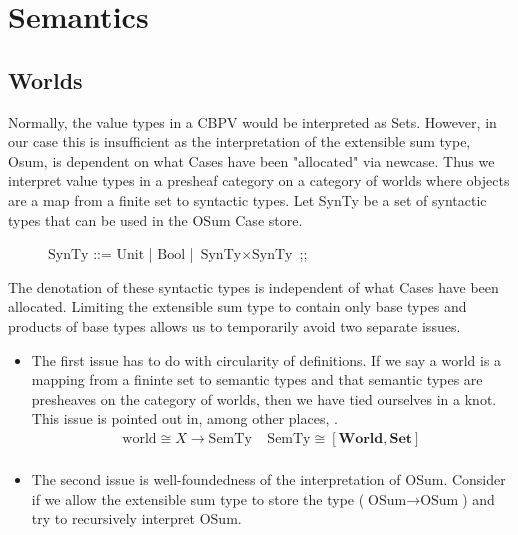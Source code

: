 \documentclass{article}
\newcommand{\world}{{\mathbf{World}}}
\begin{document}
\section{Semantics}
\subsection{Worlds}
Normally, the value types in a CBPV would be interpreted as Sets. However, in our case this is insufficient as 
the interpretation of the extensible sum type, Osum, is dependent on what Cases have been "allocated" via 
newcase. Thus we interpret value types in a presheaf category on a category of worlds where objects are a map 
from a finite set to syntactic types. Let SynTy be a set of syntactic types that can be used in the OSum Case store.

\begin{figure}[!ht]
\centering    
\begin{bnf}
$\textrm{SynTy}$ ::= $\textrm{Unit}$
| $\textrm{Bool}$
| $\textrm{SynTy} \times \textrm{SynTy}$
;;
\end{bnf}
\end{figure}

The denotation of these syntactic types is independent of what Cases have been allocated.
Limiting the extensible sum type to contain only base types and products of base types allows 
us to temporarily avoid two separate issues. 
\begin{itemize}
    \item The first issue has to do with circularity of definitions. If we say a world is a 
    mapping from a fininte set to semantic types and that semantic types are presheaves on 
    the category of worlds, then we have tied ourselves in a knot. This issue is pointed 
    out in, among other places, \cite{sterling_denotational_2023}.
    \begin{align*}
        \textrm{world} \cong X \rightarrow \textrm{SemTy} \;\;\;\; \textrm{SemTy} \cong [\world , \mathbf{Set}]\\
    \end{align*}
    
    \item The second issue is well-foundedness of the interpretation of OSum. Consider if we allow the extensible 
    sum type to store the type ($\textrm{OSum} \rightarrow \textrm{OSum}$) and try to recursively interpret $\textrm{OSum}$.

\end{itemize}
\end{document}
